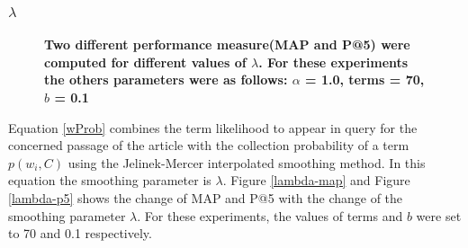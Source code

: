 \documentclass[article]{IEEEtran}
\begin{document}
\subsubsection{$\lambda$}
\begin{figure}[!ht]
\centering
\captionsetup{justification=centering}
{ \hfil 
{}} \caption{\textbf{Two different performance measure(MAP and P@5) were computed for different values of $\lambda$. For these experiments the others parameters were as follows: $\alpha$ = 1.0, terms = 70, $b$ = 0.1}} \label{lambda}
\end{figure}
Equation \ref{wProb} combines the term likelihood to appear in query for the concerned passage of the article with the collection probability of a term $p(w_i,C)$ using the Jelinek-Mercer interpolated smoothing method. In this equation the smoothing parameter is $\lambda$. Figure \ref{lambda-map} and Figure \ref{lambda-p5} shows the change of MAP and P@5 with the change of the smoothing parameter $\lambda$. For these experiments, the values of terms and $b$ were set to 70 and 0.1 respectively.
\end{document}
